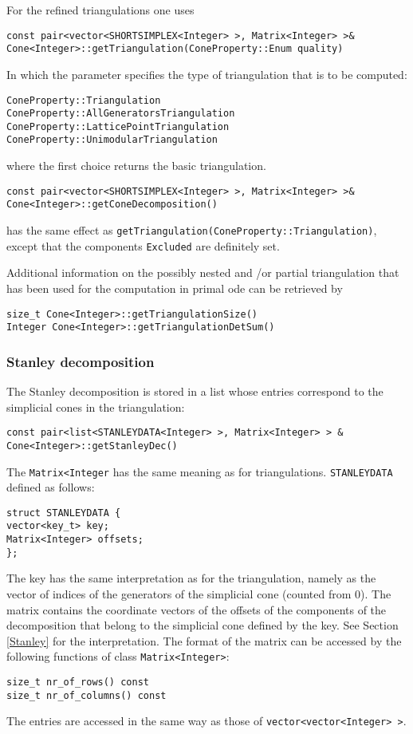 \documentclass[12pt,a4paper]{scrartcl}
\theoremstyle{definition}
\begin{document}
\begin{small}
For the refined triangulations one uses 
\begin{Verbatim}
const pair<vector<SHORTSIMPLEX<Integer> >, Matrix<Integer> >& 
Cone<Integer>::getTriangulation(ConeProperty::Enum quality)
\end{Verbatim}
In which the parameter specifies the type of triangulation that is to be computed:
\begin{Verbatim}
ConeProperty::Triangulation
ConeProperty::AllGeneratorsTriangulation
ConeProperty::LatticePointTriangulation
ConeProperty::UnimodularTriangulation
\end{Verbatim} 
where the first choice returns the basic triangulation.

\begin{Verbatim}
const pair<vector<SHORTSIMPLEX<Integer> >, Matrix<Integer> >&
Cone<Integer>::getConeDecomposition()
\end{Verbatim}
has the same effect as \verb|getTriangulation(ConeProperty::Triangulation)|, except that the components \verb|Excluded| are definitely  set.

Additional information on the possibly nested and /or partial triangulation that has been used  for the computation in primal ode can be retrieved by
\begin{Verbatim}
size_t Cone<Integer>::getTriangulationSize()
Integer Cone<Integer>::getTriangulationDetSum() 
\end{Verbatim}

\subsubsection{Stanley decomposition}

The Stanley decomposition is stored in a list whose entries correspond to the simplicial cones in the triangulation:
\begin{Verbatim}
const pair<list<STANLEYDATA<Integer> >, Matrix<Integer> > &  Cone<Integer>::getStanleyDec()
\end{Verbatim}
The \verb|Matrix<Integer| has the same meaning as for triangulations.
\verb|STANLEYDATA| defined as follows:
\begin{Verbatim}
struct STANLEYDATA {
vector<key_t> key;
Matrix<Integer> offsets;
};
\end{Verbatim}
The key has the same interpretation as for the triangulation, namely as the vector of indices of the generators of the simplicial cone (counted from $0$). The matrix contains the coordinate vectors of the offsets of the components of the decomposition that belong to the simplicial cone defined by the key. See Section \ref{Stanley} for the interpretation. The format of the matrix can be accessed by the following functions of class \verb|Matrix<Integer>|:
\begin{Verbatim}
size_t nr_of_rows() const
size_t nr_of_columns() const    
\end{Verbatim}
The entries are accessed in the same way as those of \verb|vector<vector<Integer> >|.


\end{small}
\end{document}
